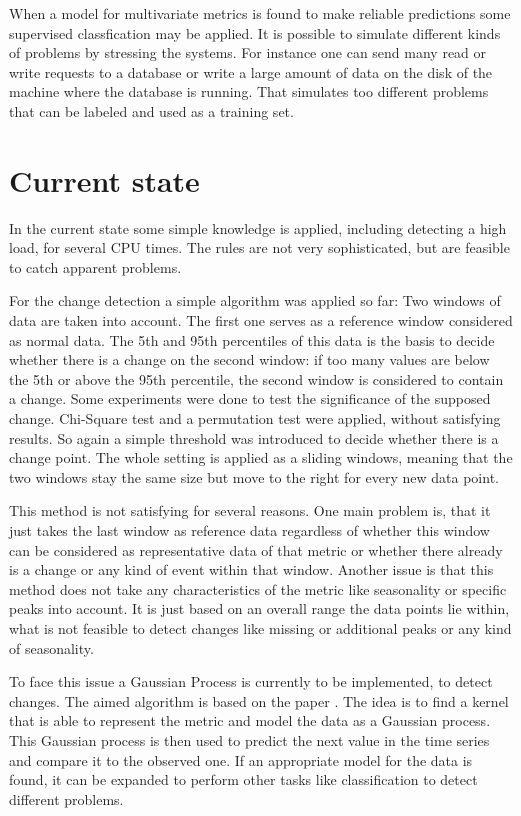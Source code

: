 \documentclass[]{article}
\begin{document}
When a model for multivariate metrics is found to make reliable predictions some supervised classfication may be applied.
It is possible to simulate different kinds of problems by stressing the systems.
For instance one can send many read or write requests to a database or write a large amount of data on the disk of the machine where the database is running.
That simulates too different problems that can be labeled and used as a training set.

\section{Current state}
In the current state some simple knowledge is applied, including detecting a high load, for several CPU times.
The rules are not very sophisticated, but are feasible to catch apparent problems.

For the change detection a simple algorithm was applied so far:
Two windows of data are taken into account.
The first one serves as a reference window considered as normal data.
The 5th and 95th percentiles of this data is the basis to decide whether there is a change on the second window: if too many values are below the 5th or above the 95th percentile, the second window is considered to contain a change.
Some experiments were done to test the significance of the supposed change.
Chi-Square test and a permutation test were applied, without satisfying results.
So again a simple threshold was introduced to decide whether there is a change point.
The whole setting is applied as a sliding windows, meaning that the two windows stay the same size but move to the right for every new data point.

This method is not satisfying for several reasons.
One main problem is, that it just takes the last window as reference data regardless of whether this window can be considered as representative data of that metric or whether there already is a change or any kind of event within that window.
Another issue is that this method does not take any characteristics of the metric like seasonality or specific peaks into account.
It is just based on an overall range the data points lie within, what is not feasible to detect changes like missing or additional peaks or any kind of seasonality.

To face this issue a Gaussian Process is currently to be implemented, to detect changes.
The aimed algorithm is based on the paper \cite{gpcd}. %
The idea is to find a kernel that is able to represent the metric and model the data as a Gaussian process.
This Gaussian process is then used to predict the next value in the time series and compare it to the observed one.
If an appropriate model for the data is found, it can be expanded to perform other tasks like classification to detect different problems.
\end{document}
